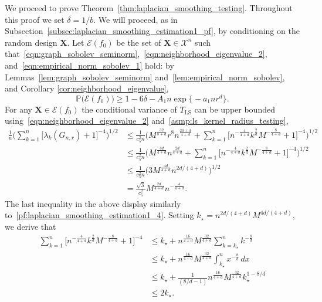 \documentclass[twoside]{article}
\newcommand{\1}{\mathbf{1}}
\newcommand{\Xset}{\mathcal{X}}
\newcommand{\mc}[1]{\mathcal{#1}}
\newcommand{\Pbb}{\mathbb{P}}
\newcommand{\LS}{\mathrm{LS}}
\theoremstyle{definition}
\theoremstyle{remark}
\begin{document}
We proceed to prove Theorem~\ref{thm:laplacian_smoothing_testing}. Throughout this proof we set $\delta = 1/b$. We will proceed, as in Subsection~\ref{subsec:laplacian_smoothing_estimation1_pf}, by conditioning on the random design $\mathbf{X}$. Let $\mc{E}(f_0)$ be the set of $\mathbf{X} \in \Xset^n$ such that~\eqref{eqn:graph_sobolev_seminorm},~\eqref{eqn:neighborhood_eigenvalue_2}, and~\eqref{eqn:empirical_norm_sobolev_1} hold: by Lemmas~\ref{lem:graph_sobolev_seminorm} and~\ref{lem:empirical_norm_sobolev}, and Corollary \ref{cor:neighborhood_eigenvalue},
\begin{equation*}
\Pbb\bigl(\mc{E}(f_0)\bigr) \geq 1 - 6\delta - A_1n\exp\bigl\{-a_1nr^d\bigr\}. 
\end{equation*}
For any $\mathbf{X} \in \mc{E}(f_0)$ the conditional variance of $T_{\LS}$ can be upper bounded using~\eqref{eqn:neighborhood_eigenvalue_2} and~\ref{asmp:ls_kernel_radius_testing},
\begin{align*}
\frac{1}{n} \biggl(\sum_{k = 1}^{n} \bigl[\lambda_k(G_{n,r}) + 1\bigr]^{-4}\biggr)^{1/2} & \leq \frac{1}{c_5^2 n} \biggl(M^{\frac{32}{8 + d}}r^8n^{\frac{20+d}{4+d}} + \sum_{k = 1}^{n} \bigl[n^{-\frac{4}{4 + d}}k^{\frac{2}{d}}M^{-\frac{8}{4 + d}} + 1\bigr]^{-4}\biggr)^{1/2} \\
& \leq \frac{1}{c_5^2 n} \biggl(M^{\frac{4d}{4 + d}}n^{\frac{2d}{4 + d}} + \sum_{k = 1}^{n} \bigl[n^{-\frac{4}{4 + d}}k^{\frac{2}{d}}M^{-\frac{8}{4 + d}} + 1\bigr]^{-4}\biggr)^{1/2} \\
& \leq \frac{1}{c_5^2 n} \biggl(3 M^{\frac{4d}{4 + d}}n^{2d/(4 + d)}\biggr)^{1/2} \\
& = \frac{\sqrt{3}}{c_5^2} M^{\frac{2d}{4 + d}} n^{-\frac{4}{4 + d}}.
\end{align*}
The last inequality in the above display similarly to~\eqref{pf:laplacian_smoothing_estimation1_4}. Setting $k_{\star} = n^{2d/(4+d)}M^{4d/(4 + d)}$, we derive that
\begin{equation}
\begin{aligned}
\label{pf:laplacian_smooting_testing1}
\sum_{k = 1}^{n} \bigl[n^{-\frac{4}{4 + d}}k^{\frac{2}{d}}M^{-\frac{8}{4 + d}} + 1\bigr]^{-4} & \leq k_{\star} + n^{\frac{16}{4 + d}} M^{\frac{32}{4 + d}}\sum_{k = k_{\star}}^{n} k^{-\frac{8}{d}}\\
& \leq k_{\star} + n^{\frac{16}{4 + d}} M^{\frac{32}{4 + d}} \int_{k_{\star}}^{n} x^{-\frac{8}{d}} \,dx \\
& \leq  k_{\star} + \frac{1}{(8/d - 1)}n^{\frac{16}{4 + d}} M^{\frac{32}{4 + d}} k_{\star}^{1 - 8/d} \\
& \leq 2k_{\star}.
\end{aligned}
\end{equation}
\end{document}
